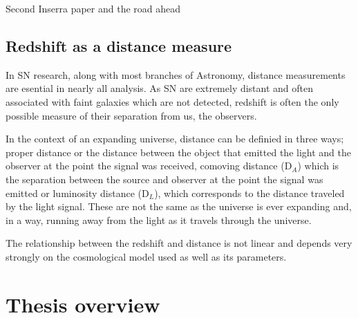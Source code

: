 Second Inserra paper and the road ahead

\subsection{Redshift as a distance measure}
In SN research, along with most branches of Astronomy, distance measurements are esential in nearly all analysis. As SN are extremely distant and often associated with faint galaxies which are not detected, redshift is often the only possible measure of their separation from us, the observers.

In the context of an expanding universe, distance can be definied in three ways; proper distance or the distance between the object that emitted the light and the observer at the point the signal was received, comoving distance (D$_A$) which is the separation between the source and observer at the point the signal was emitted or luminosity distance (D$_L$), which corresponds to the distance traveled by the light signal. These are not the same as the universe is ever expanding and, in a way, running away from the light as it travels through the universe.

The relationship between the redshift and distance is not linear and depends very strongly on the cosmological model used as well as its parameters.


\section{Thesis overview}
